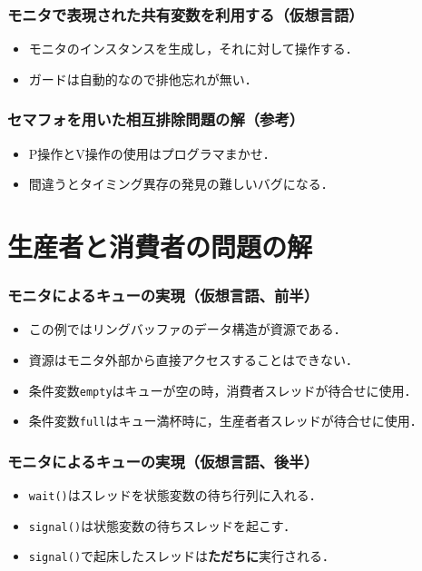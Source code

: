 \documentclass[dvipdfmx]{beamer}
\begin{document}
\begin{frame}
  \frametitle{モニタで表現された共有変数を利用する（仮想言語）}
  

  \begin{itemize}
  \item モニタのインスタンスを生成し，それに対して操作する．
  \item ガードは自動的なので排他忘れが無い．
  \end{itemize}
\end{frame}

\begin{frame}
  \frametitle{セマフォを用いた相互排除問題の解（参考）}
  

  \begin{itemize}
  \item P操作とV操作の使用はプログラマまかせ．
  \item 間違うとタイミング異存の発見の難しいバグになる．
  \end{itemize}
\end{frame}

\section{生産者と消費者の問題の解}
\begin{frame}
  \frametitle{モニタによるキューの実現（仮想言語、前半）}
  

  \begin{itemize}
  \item この例ではリングバッファのデータ構造が資源である．
  \item 資源はモニタ外部から直接アクセスすることはできない．
  \item 条件変数{\tt empty}はキューが空の時，消費者スレッドが待合せに使用．
  \item 条件変数{\tt full}はキュー満杯時に，生産者者スレッドが待合せに使用．
  \end{itemize}
\end{frame}

\begin{frame}
  \frametitle{モニタによるキューの実現（仮想言語、後半）}
  

  \begin{itemize}
  \item {\tt wait()}はスレッドを状態変数の待ち行列に入れる．
  \item {\tt signal()}は状態変数の待ちスレッドを起こす．
  \item {\tt signal()}で起床したスレッドは{\bf ただちに}実行される．
  \end{itemize}
\end{frame}
\end{document}
